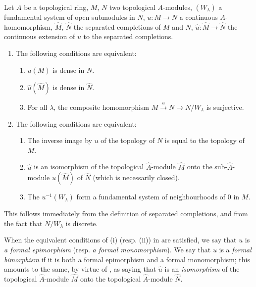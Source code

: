 \begin{proposition}[19.1.1]
\label{0.19.1.1}
Let $A$ be a topological ring, $M$, $N$ two topological $A$-modules, $(W_\lambda)$ a fundamental system of open submodules in $N$, $u:M\to N$ a continuous $A$-homomorphism, $\widehat{M}$, $\widehat{N}$ the separated completions of $M$ and $N$, $\hat{u}:\widehat{M}\to\widehat{N}$ the continuous extension of $u$ to the separated completions.
\begin{enumerate}
  \item[\textup{(i)}] The following conditions are equivalent:
  \begin{enumerate}
    \item[\textup{a)}] $u(M)$ is dense in $N$.
    \item[\textup{a$'$)}] $\hat{u}(\widehat{M})$ is dense in $\widehat{N}$.
    \item[\textup{a$''$)}] For all $\lambda$, the composite homomorphism $M\xrightarrow{u}N\to N/W_\lambda$ is surjective.
  \end{enumerate}
  \item[\textup{(ii)}] The following conditions are equivalent:
  \begin{enumerate}
    \item[\textup{b)}] The inverse image by $u$ of the topology of $N$ is equal to the topology of $M$.
    \item[\textup{b$'$)}] $\hat{u}$ is an isomorphism of the topological $\widehat{A}$-module $\widehat{M}$ onto the sub-$\widehat{A}$-module $\hat{u}(\widehat{M})$ of $\widehat{N}$ (which is necessarily closed).
    \item[\textup{b$''$)}] The $u^{-1}(W_\lambda)$ form a fundamental system of neighbourhoods of $0$ in $M$.
  \end{enumerate}
\end{enumerate}
\end{proposition}

This follows immediately from the definition of separated completions, and from the fact that $N/W_\lambda$ is discrete.

\begin{env}[19.1.2]
\label{0.19.1.2}
When the equivalent conditions of (i) (resp. (ii)) in  are satisfied, we say that $u$ is \emph{a formal epimorphism} (resp. \emph{a formal monomorphism}).
We say that $u$ is a \emph{formal bimorphism} if it is both a formal epimorphism and a formal monomorphism;
this amounts to the same, by virtue of , as saying that $\hat{u}$ is an \emph{isomorphism} of the topological $\widehat{A}$-module $\widehat{M}$ onto the topological $\widehat{A}$-module $\widehat{N}$.
\end{env}

